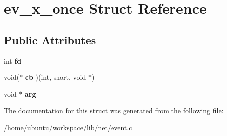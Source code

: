 \hypertarget{structev__x__once}{\section{ev\-\_\-x\-\_\-once Struct Reference}
\label{structev__x__once}
}
\subsection*{Public Attributes}
\begin{DoxyCompactItemize}
\item 
\hypertarget{structev__x__once_ad8bab46828192f0962c4c5b523cff7ef}{int {\bfseries fd}}\label{structev__x__once_ad8bab46828192f0962c4c5b523cff7ef}

\item 
\hypertarget{structev__x__once_a65af661a9a3718ff8deaafb266791355}{void($\ast$ {\bfseries cb} )(int, short, void $\ast$)}\label{structev__x__once_a65af661a9a3718ff8deaafb266791355}

\item 
\hypertarget{structev__x__once_a982a915afeeacdbcf2612bd6da70a2eb}{void $\ast$ {\bfseries arg}}\label{structev__x__once_a982a915afeeacdbcf2612bd6da70a2eb}

\end{DoxyCompactItemize}


The documentation for this struct was generated from the following file\-:\begin{DoxyCompactItemize}
\item 
/home/ubuntu/workspace/lib/net/event.\-c\end{DoxyCompactItemize}
